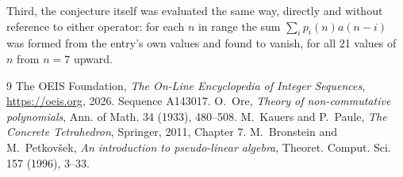 \documentclass[11pt,a4paper]{article}
\theoremstyle{plain}
\theoremstyle{definition}
\begin{document}
Third, the conjecture itself was evaluated the same way, directly and without reference to
either operator: for each $n$ in range the sum $\sum_{i}p_{i}(n)a(n-i)$ was formed from the
entry's own values and found to vanish, for all 21 values of $n$ from
$n=7$ upward.

\begin{thebibliography}{9}
 The OEIS Foundation, \emph{The On-Line Encyclopedia of Integer Sequences},
\url{https://oeis.org}, 2026. Sequence A143017.
 O.~Ore, \emph{Theory of non-commutative polynomials}, Ann. of Math. 34
(1933), 480--508.
 M.~Kauers and P.~Paule, \emph{The Concrete Tetrahedron}, Springer, 2011,
Chapter 7.
 M.~Bronstein and M.~Petkov\v{s}ek, \emph{An introduction to
pseudo-linear algebra}, Theoret. Comput. Sci. 157 (1996), 3--33.
\end{thebibliography}
\end{document}
